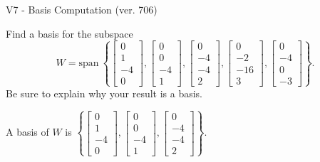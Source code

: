 \begin{exercise}
  \begin{exerciseTitle}V7 - Basis Computation (ver. 706)\end{exerciseTitle}
  \begin{exerciseStatement}
    Find a basis for the subspace 
\[W=\mathrm{span}\ \left\{\left[\begin{array}{r}
0 \\
1 \\
-4 \\
0
\end{array}\right] , \left[\begin{array}{r}
0 \\
0 \\
-4 \\
1
\end{array}\right] , \left[\begin{array}{r}
0 \\
-4 \\
-4 \\
2
\end{array}\right] , \left[\begin{array}{r}
0 \\
-2 \\
-16 \\
3
\end{array}\right] , \left[\begin{array}{r}
0 \\
-4 \\
0 \\
-3
\end{array}\right]\right\}.\]
 Be sure to explain why your result is a basis.


  \end{exerciseStatement}
  \begin{exerciseAnswer}
   A basis of \(W\) is  \(\left\{\left[\begin{array}{r}
0 \\
1 \\
-4 \\
0
\end{array}\right] , \left[\begin{array}{r}
0 \\
0 \\
-4 \\
1
\end{array}\right] , \left[\begin{array}{r}
0 \\
-4 \\
-4 \\
2
\end{array}\right]\right\}\).
  


  \end{exerciseAnswer}
\end{exercise}